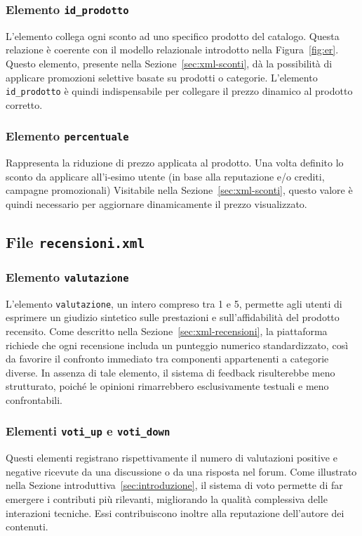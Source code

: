 \documentclass[a4paper,12pt]{report}
\begin{document}
\subsubsection*{Elemento \texttt{id\_prodotto}}
L’elemento collega ogni sconto ad uno specifico prodotto del catalogo.  
Questa relazione è coerente con il modello relazionale introdotto nella 
Figura~\ref{fig:er}.  
Questo elemento, presente nella Sezione~\ref{sec:xml-sconti}, dà la possibilità di applicare promozioni selettive basate su prodotti o categorie.  
L’elemento \texttt{id\_prodotto} è quindi indispensabile per collegare il prezzo 
dinamico al prodotto corretto.

\subsubsection*{Elemento \texttt{percentuale}}
Rappresenta la riduzione di prezzo applicata al prodotto. Una volta definito lo sconto da applicare all'i-esimo utente (in base alla reputazione e/o crediti, campagne promozionali)
Visitabile nella Sezione~\ref{sec:xml-sconti}, questo valore è quindi necessario per aggiornare dinamicamente il prezzo visualizzato.

\subsection{File \texttt{recensioni.xml}}

\subsubsection*{Elemento \texttt{valutazione}}
L’elemento \texttt{valutazione}, un intero compreso tra 1 e 5, permette agli utenti di esprimere 
un giudizio sintetico sulle prestazioni e sull’affidabilità del prodotto recensito.  
Come descritto nella Sezione~\ref{sec:xml-recensioni}, la piattaforma richiede 
che ogni recensione includa un punteggio numerico standardizzato, così da favorire 
il confronto immediato tra componenti appartenenti a categorie diverse.  
In assenza di tale elemento, il sistema di feedback risulterebbe meno strutturato, 
poiché le opinioni rimarrebbero esclusivamente testuali e meno confrontabili.

\subsubsection*{Elementi \texttt{voti\_up} e \texttt{voti\_down}}
Questi elementi registrano rispettivamente il numero di valutazioni positive e negative 
ricevute da una discussione o da una risposta nel forum.  
Come illustrato nella Sezione introduttiva~\ref{sec:introduzione}, il sistema 
di voto permette di far emergere i contributi più rilevanti, migliorando la qualità 
complessiva delle interazioni tecniche. Essi contribuiscono inoltre alla reputazione 
dell’autore dei contenuti.
\end{document}
